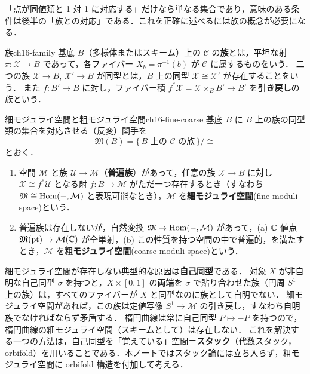 「点が同値類と 1 対 1 に対応する」だけなら単なる集合であり，意味のある条件は後半の「族との対応」である．これを正確に述べるには族の概念が必要になる．

\begin{mydef}{族}{ch16-family}
基底 $B$（多様体またはスキーム）上の $\mathcal{C}$ の\textbf{族}とは，平坦な射 $\pi:\mathcal{X}\to B$ であって，各ファイバー $X_b=\pi^{-1}(b)$ が $\mathcal{C}$ に属するものをいう．
二つの族 $\mathcal{X}\to B$, $\mathcal{X}'\to B$ が同型とは，$B$ 上の同型 $\mathcal{X}\cong \mathcal{X}'$ が存在することをいう．
また $f:B'\to B$ に対し，ファイバー積 $f^*\mathcal{X}=\mathcal{X}\times_B B'\to B'$ を\textbf{引き戻し}の族という．
\end{mydef}

\begin{mydef}{細モジュライ空間と粗モジュライ空間}{ch16-fine-coarse}
基底 $B$ に $B$ 上の族の同型類の集合を対応させる（反変）関手を
\[
\mathfrak{M}(B)=\{\,B \text{ 上の } \mathcal{C} \text{ の族}\,\}/\cong
\]
とおく．
\begin{enumerate}
\item 空間 $\mathcal{M}$ と族 $\mathcal{U}\to\mathcal{M}$（\textbf{普遍族}）があって，任意の族 $\mathcal{X}\to B$ に対し $\mathcal{X}\cong f^*\mathcal{U}$ となる射 $f:B\to\mathcal{M}$ がただ一つ存在するとき（すなわち $\mathfrak{M}\cong \operatorname{Hom}(-,\mathcal{M})$ と表現可能なとき），$\mathcal{M}$ を\textbf{細モジュライ空間}(fine moduli space)という．
\item 普遍族は存在しないが，自然変換 $\mathfrak{M}\to\operatorname{Hom}(-,\mathcal{M})$ があって，(a) $\mathbb{C}$ 値点 $\mathfrak{M}(\mathrm{pt})\to\mathcal{M}(\mathbb{C})$ が全単射，(b) この性質を持つ空間の中で普遍的，を満たすとき，$\mathcal{M}$ を\textbf{粗モジュライ空間}(coarse moduli space)という．
\end{enumerate}
\end{mydef}

\begin{note}
細モジュライ空間が存在しない典型的な原因は\textbf{自己同型}である．
対象 $X$ が非自明な自己同型 $\sigma$ を持つと，$X\times[0,1]$ の両端を $\sigma$ で貼り合わせた族（円周 $S^1$ 上の族）は，すべてのファイバーが $X$ と同型なのに族として自明でない．
細モジュライ空間があれば，この族は定値写像 $S^1\to\mathcal{M}$ の引き戻し，すなわち自明族でなければならず矛盾する．
楕円曲線は常に自己同型 $P\mapsto -P$ を持つので，楕円曲線の細モジュライ空間（スキームとして）は存在しない．
これを解決する一つの方法は，自己同型を「覚えている」空間＝\textbf{スタック}（代数スタック，orbifold）を用いることである．本ノートではスタック論には立ち入らず，粗モジュライ空間に orbifold 構造を付加して考える．
\end{note}

